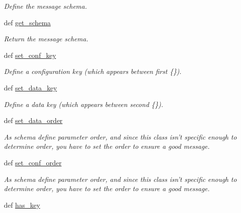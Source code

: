 \begin{CompactItemize}
\begin{CompactList}\small\item\em Define the message schema. \item\end{CompactList}\item 
\hypertarget{classxPLAPI_1_1Message_58df48b064cb3d59780a51c67136e88a}{
def \hyperlink{classxPLAPI_1_1Message_58df48b064cb3d59780a51c67136e88a}{get\_\-schema}}
\label{classxPLAPI_1_1Message_58df48b064cb3d59780a51c67136e88a}

\begin{CompactList}\small\item\em Return the message schema. \item\end{CompactList}\item 
\hypertarget{classxPLAPI_1_1Message_014808e1035dcea973692d4d823427ce}{
def \hyperlink{classxPLAPI_1_1Message_014808e1035dcea973692d4d823427ce}{set\_\-conf\_\-key}}
\label{classxPLAPI_1_1Message_014808e1035dcea973692d4d823427ce}

\begin{CompactList}\small\item\em Define a configuration key (which appears between first \{\}). \item\end{CompactList}\item 
\hypertarget{classxPLAPI_1_1Message_6bc039067bf79dd06b649e95870cfba9}{
def \hyperlink{classxPLAPI_1_1Message_6bc039067bf79dd06b649e95870cfba9}{set\_\-data\_\-key}}
\label{classxPLAPI_1_1Message_6bc039067bf79dd06b649e95870cfba9}

\begin{CompactList}\small\item\em Define a data key (which appears between second \{\}). \item\end{CompactList}\item 
def \hyperlink{classxPLAPI_1_1Message_254a763505a2ddb64ecd8d1b96f984d6}{set\_\-data\_\-order}
\begin{CompactList}\small\item\em As schema define parameter order, and since this class isn't specific enough to determine order, you have to set the order to ensure a good message. \item\end{CompactList}\item 
def \hyperlink{classxPLAPI_1_1Message_191e86e1dccd20aa0ea63158429e6d68}{set\_\-conf\_\-order}
\begin{CompactList}\small\item\em As schema define parameter order, and since this class isn't specific enough to determine order, you have to set the order to ensure a good message. \item\end{CompactList}\item 
\hypertarget{classxPLAPI_1_1Message_e8bde03ac8436238c97cad324897c2ee}{
def \hyperlink{classxPLAPI_1_1Message_e8bde03ac8436238c97cad324897c2ee}{has\_\-key}}
\label{classxPLAPI_1_1Message_e8bde03ac8436238c97cad324897c2ee}


\end{CompactItemize}
